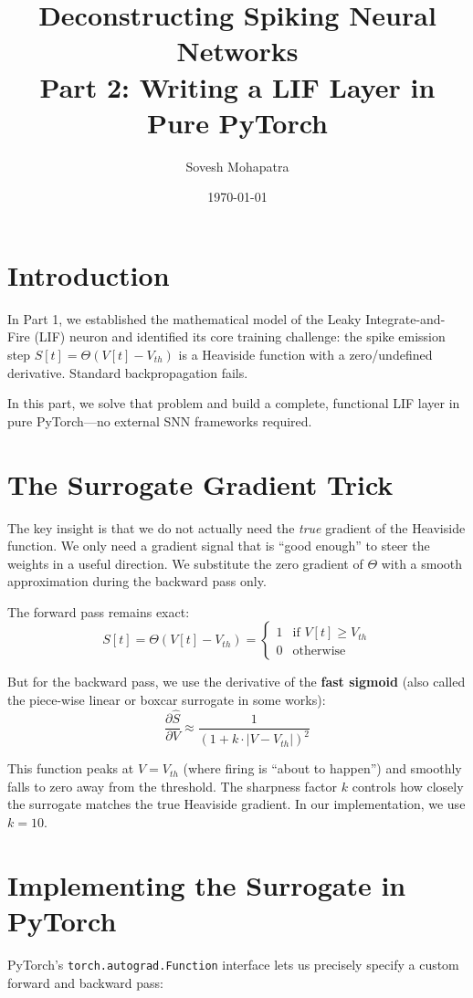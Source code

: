\documentclass[12pt]{article}
\title{\textbf{Deconstructing Spiking Neural Networks \\ Part 2: Writing a LIF Layer in Pure PyTorch}}
\author{Sovesh Mohapatra}
\date{\today}
\begin{document}
\maketitle

\section*{Introduction}
In Part 1, we established the mathematical model of the Leaky Integrate-and-Fire (LIF) neuron and identified its core training challenge: the spike emission step $S[t] = \Theta(V[t] - V_{th})$ is a Heaviside function with a zero/undefined derivative. Standard backpropagation fails.

In this part, we solve that problem and build a complete, functional LIF layer in pure PyTorch—no external SNN frameworks required.

\section*{The Surrogate Gradient Trick}
The key insight is that we do not actually need the \textit{true} gradient of the Heaviside function. We only need a gradient signal that is ``good enough'' to steer the weights in a useful direction. We substitute the zero gradient of $\Theta$ with a smooth approximation during the backward pass only.

The forward pass remains exact:
\begin{equation}
    S[t] = \Theta(V[t] - V_{th}) = \begin{cases} 1 & \text{if } V[t] \geq V_{th} \\ 0 & \text{otherwise} \end{cases}
\end{equation}

But for the backward pass, we use the derivative of the \textbf{fast sigmoid} (also called the piece-wise linear or boxcar surrogate in some works):
\begin{equation}
    \frac{\partial \hat{S}}{\partial V} \approx \frac{1}{\left(1 + k \cdot |V - V_{th}|\right)^2}
\end{equation}

This function peaks at $V = V_{th}$ (where firing is ``about to happen'') and smoothly falls to zero away from the threshold. The sharpness factor $k$ controls how closely the surrogate matches the true Heaviside gradient. In our implementation, we use $k = 10$.

\section*{Implementing the Surrogate in PyTorch}
PyTorch's \texttt{torch.autograd.Function} interface lets us precisely specify a custom forward and backward pass:
\end{document}
